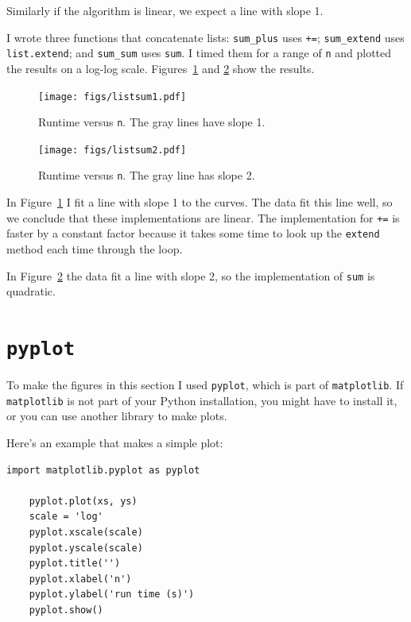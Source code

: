 \documentclass[10pt]{book}
\begin{document}
Similarly if the algorithm is linear, we expect a line with
slope 1.

I wrote three functions that concatenate lists: \verb"sum_plus" uses
{\tt +=}; \verb"sum_extend" uses {\tt list.extend}; and \verb"sum_sum"
uses {\tt sum}.  I timed them for a range of {\tt n} and plotted the
results on a log-log scale.  Figures~\ref{listsum1} and \ref{listsum2}
show the results.

\begin{figure}
\centerline{\texttt{[image: figs/listsum1.pdf]}}
\caption{Runtime versus {\tt n}.  The gray lines have slope 1.\label{listsum1}}
\end{figure}

\begin{figure}
\centerline{\texttt{[image: figs/listsum2.pdf]}}
\caption{Runtime versus {\tt n}.  The gray line has slope 2.\label{listsum2}}
\end{figure}

In Figure~\ref{listsum1} I fit a line with slope 1 to the curves.
The data fit this line well, so we conclude
that these implementations are linear.  The implementation for {\tt +=}
is faster by a constant factor because it takes some time
to look up the {\tt extend} method each time through the loop.

In Figure~\ref{listsum2} the data fit a line with slope 2, so the
implementation of {\tt sum} is quadratic.


\section{{\tt pyplot}}
\label{pyplot}

To make the figures in this section I used {\tt pyplot}, which is part of
{\tt matplotlib}.  If {\tt matplotlib} is not part of your Python
installation, you might have to install it, or you can use another
library to make plots.

Here's an example that makes a simple plot:

\begin{verbatim}
import matplotlib.pyplot as pyplot

    pyplot.plot(xs, ys)
    scale = 'log'
    pyplot.xscale(scale)
    pyplot.yscale(scale)
    pyplot.title('')
    pyplot.xlabel('n')
    pyplot.ylabel('run time (s)')
    pyplot.show()
\end{verbatim}
\end{document}
